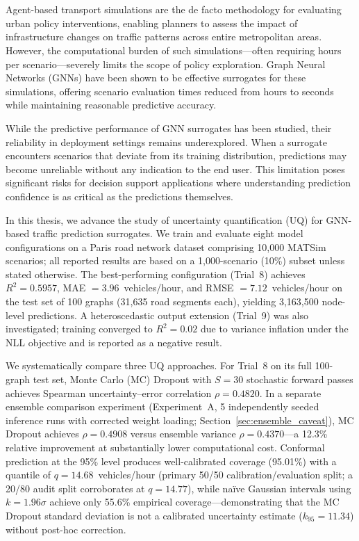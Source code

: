 \chapter{\abstractname}

Agent-based transport simulations are the de facto methodology for evaluating urban policy interventions, enabling planners to assess the impact of infrastructure changes on traffic patterns across entire metropolitan areas. However, the computational burden of such simulations---often requiring hours per scenario---severely limits the scope of policy exploration. Graph Neural Networks (GNNs) have been shown to be effective surrogates for these simulations, offering scenario evaluation times reduced from hours to seconds while maintaining reasonable predictive accuracy.

While the predictive performance of GNN surrogates has been studied, their reliability in deployment settings remains underexplored. When a surrogate encounters scenarios that deviate from its training distribution, predictions may become unreliable without any indication to the end user. This limitation poses significant risks for decision support applications where understanding prediction confidence is as critical as the predictions themselves.

In this thesis, we advance the study of uncertainty quantification (UQ) for GNN-based traffic prediction surrogates. We train and evaluate eight model configurations on a Paris road network dataset comprising 10,000 MATSim scenarios; all reported results are based on a 1,000-scenario (10\%) subset unless stated otherwise. The best-performing configuration (Trial~8) achieves $R^2 = 0.5957$, MAE $= 3.96$~vehicles/hour, and RMSE $= 7.12$~vehicles/hour on the test set of 100 graphs (31,635 road segments each), yielding 3,163,500 node-level predictions. A heteroscedastic output extension (Trial~9) was also investigated; training converged to $R^2 = 0.02$ due to variance inflation under the NLL objective and is reported as a negative result.

We systematically compare three UQ approaches. For Trial~8 on its full 100-graph test set, Monte Carlo (MC) Dropout with $S = 30$ stochastic forward passes achieves Spearman uncertainty--error correlation $\rho = 0.4820$. In a separate ensemble comparison experiment (Experiment~A, 5 independently seeded inference runs with corrected weight loading; Section~\ref{sec:ensemble_caveat}), MC Dropout achieves $\rho = 0.4908$ versus ensemble variance $\rho = 0.4370$---a 12.3\% relative improvement at substantially lower computational cost. Conformal prediction at the 95\% level produces well-calibrated coverage (95.01\%) with a quantile of $q = 14.68$~vehicles/hour (primary 50/50 calibration/evaluation split; a 20/80 audit split corroborates at $q = 14.77$), while na\"{i}ve Gaussian intervals using $k = 1.96\sigma$ achieve only 55.6\% empirical coverage---demonstrating that the MC Dropout standard deviation is not a calibrated uncertainty estimate ($k_{95} = 11.34$) without post-hoc correction.

